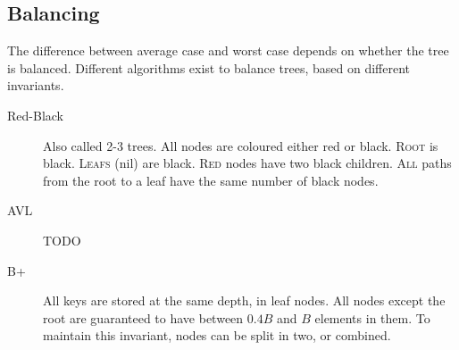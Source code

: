 \documentclass[landscape]{cheat}
\begin{document}
\begin{multicols}{3}
\subsection{Balancing}
The difference between average case and worst case depends on whether the tree is balanced.
Different algorithms exist to balance trees, based on different invariants.

\begin{description}
    \item[Red-Black]
        Also called 2-3 trees.
        All nodes are coloured either red or black.
        \textsc{Root} is black.
        \textsc{Leafs} (nil) are black.
        \textsc{Red} nodes have two black children.
        \textsc{All} paths from the root to a leaf have the same number of black nodes.
    \item[AVL] TODO
    \item[B+]
        All keys are stored at the same depth, in leaf nodes.
        All nodes except the root are guaranteed to have between $0.4B$ and $B$ elements in them.
        To maintain this invariant, nodes can be split in two, or combined.
\end{description}


\end{multicols}
\end{document}
